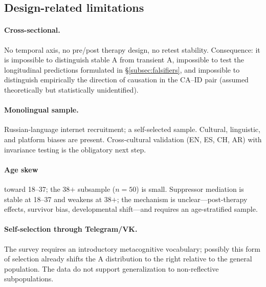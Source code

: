 \subsection{Design-related limitations}

\paragraph{Cross-sectional.} No temporal axis, no pre/post therapy design, no retest stability. Consequence: it is impossible to distinguish stable A from transient A, impossible to test the longitudinal predictions formulated in §\ref{subsec:falsifiers}, and impossible to distinguish empirically the direction of causation in the CA--ID pair (assumed theoretically but statistically unidentified).

\paragraph{Monolingual sample.} Russian-language internet recruitment; a self-selected sample. Cultural, linguistic, and platform biases are present. Cross-cultural validation (EN, ES, CH, AR) with invariance testing is the obligatory next step.

\paragraph{Age skew} toward 18--37; the 38$+$ subsample ($n = 50$) is small. Suppressor mediation is stable at 18--37 and weakens at 38$+$; the mechanism is unclear---post-therapy effects, survivor bias, developmental shift---and requires an age-stratified sample.

\paragraph{Self-selection through Telegram/VK.} The survey requires an introductory metacognitive vocabulary; possibly this form of selection already shifts the A distribution to the right relative to the general population. The data do not support generalization to non-reflective subpopulations.


